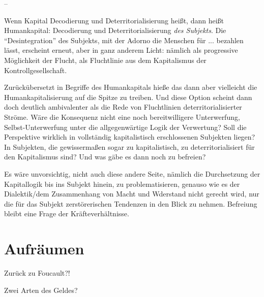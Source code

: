 \documentclass[12pt,
               DIV13,
               paper=a4,
               twoside=false,
               onehalfspacing,
               bibliography=totoc,
               toc=graduated,
               draft,
               ]{scrartcl}
\newcommand{\worries}[1]{\ifdraft{\textcolor{blue}{\texttt{(#1)}}}{}}
\begin{document}
--

Wenn Kapital Decodierung und Deterritorialisierung heißt, dann heißt
Humankapital: Decodierung und Deterritorialisierung \emph{des
Subjekts}. Die "`Desintegration"' des Subjekts, mit der Adorno die
Menschen für ... bezahlen lässt, erscheint erneut, aber in ganz
anderem Licht: nämlich als progressive Möglichkeit der Flucht, als
Fluchtlinie aus dem Kapitalismus der Kontrollgesellschaft.

Zurückübersetzt in Begriffe des Humankapitals hieße das dann aber
vielleicht die Humankapitalisierung auf die Spitze zu treiben. Und
diese Option scheint dann doch deutlich ambivalenter als die Rede von
Fluchtlinien deterritorialisierter Ströme. Wäre die Konsequenz nicht
eine noch bereitwilligere Unterwerfung, Selbst-Unterwerfung unter die
allgegenwärtige Logik der Verwertung? Soll die Perspektive wirklich in
vollständig kapitalistisch erschlossenen Subjekten liegen? In
Subjekten, die gewissermaßen sogar zu kapitalistisch, zu
deterritorialisiert für den Kapitalismus sind? Und was gäbe es dann noch
zu befreien? \worries{"`vorsubjektive Einheiten"'}

Es wäre unvorsichtig, nicht auch diese andere Seite, nämlich die
Durchsetzung der Kapitallogik bis ins Subjekt hinein, zu
problematisieren, genauso wie es der Dialektik/dem Zusammenhang von
Macht und Wderstand nicht gerecht wird, nur die für das Subjekt
zerstörerischen Tendenzen in den Blick zu nehmen. Befreiung bleibt
eine Frage der Kräfteverhältnisse.


\section{Aufräumen}

Zurück zu Foucault?!

Zwei Arten des Geldes?


\newpage
\printshorthands
\printbibliography
\end{document}
